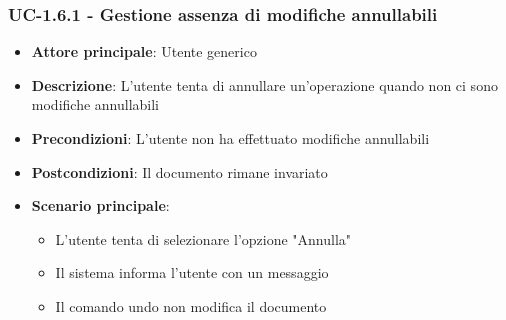 \documentclass[11pt,a4paper]{article}
\begin{document}
\subsubsection{UC-1.6.1 - Gestione assenza di modifiche annullabili}
\begin{itemize}
    \item \textbf{Attore principale}: Utente generico
    \item \textbf{Descrizione}: L'utente tenta di annullare un'operazione quando non ci sono modifiche annullabili
    \item \textbf{Precondizioni}: L'utente non ha effettuato modifiche annullabili
    \item \textbf{Postcondizioni}: Il documento rimane invariato
    \item \textbf{Scenario principale}:
        \begin{itemize}
            \item L'utente tenta di selezionare l'opzione "Annulla"
            \item Il sistema informa l'utente con un messaggio
            \item Il comando undo non modifica il documento
        \end{itemize}
\end{itemize}
\end{document}
